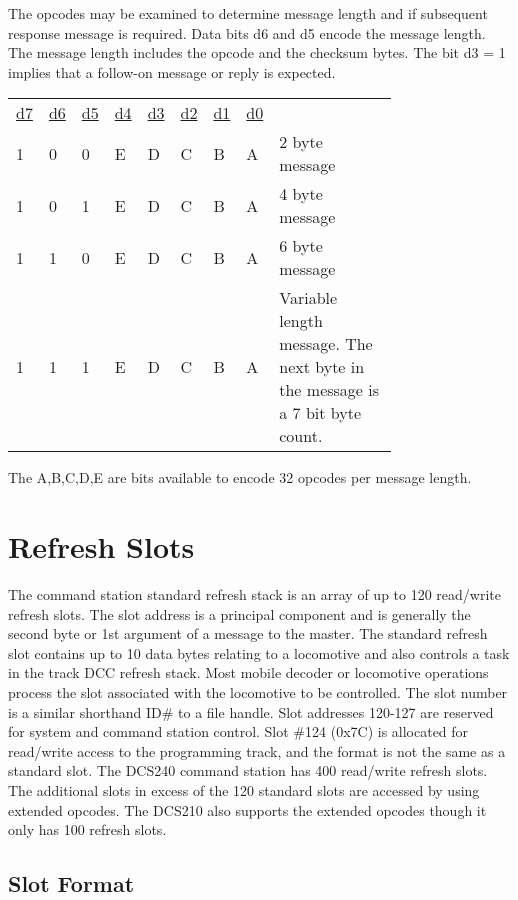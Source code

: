 The opcodes may be examined to determine message length and if subsequent response message is required. Data bits d6 and d5 encode the message length. The message length includes the opcode and the checksum bytes. The bit d3 = 1 implies that a follow-on message or reply is expected.

\begin{tabular}{p{0.05\linewidth} p{0.05\linewidth}  p{0.05\linewidth}  p{0.05\linewidth}  p{0.05\linewidth}  p{0.05\linewidth}  p{0.05\linewidth}  p{0.05\linewidth} p{0.36\linewidth}} 
\underline{d7} & \underline{d6} & \underline{d5} & \underline{d4} & \underline{d3} & \underline{d2} & \underline{d1} & \underline{d0} & \\
1 & 0 & 0 & E & D & C & B & A & 2 byte message\\
1 & 0 & 1 & E & D & C & B & A & 4 byte message\\
1 & 1 & 0 & E & D & C & B & A & 6 byte message\\
1 & 1 & 1 & E & D & C & B & A & Variable length message. The next byte in the message is a 7 bit byte count.\\
\end{tabular}

The A,B,C,D,E are bits available to encode 32 opcodes per message length.

\section{Refresh Slots}
The command station standard refresh stack is an array of up to 120 read/write refresh slots. The slot address is a principal component and is generally the second byte or 1st argument of a message to the master. The standard refresh slot contains up to 10 data bytes relating to a locomotive and also controls a task in the track DCC refresh stack. Most mobile decoder or locomotive operations process the slot associated with the locomotive to be controlled. The slot number is a similar shorthand ID\# to a file handle. Slot addresses 120-127 are reserved for system and command station control. Slot \#124 (0x7C) is allocated for read/write access to the programming track, and the format is not the same as a standard slot. The DCS240 command station has 400 read/write refresh slots. The additional slots in excess of the 120 standard slots are accessed by using extended opcodes. The DCS210 also supports the extended opcodes though it only has 100 refresh slots.

\subsection{Slot Format}

